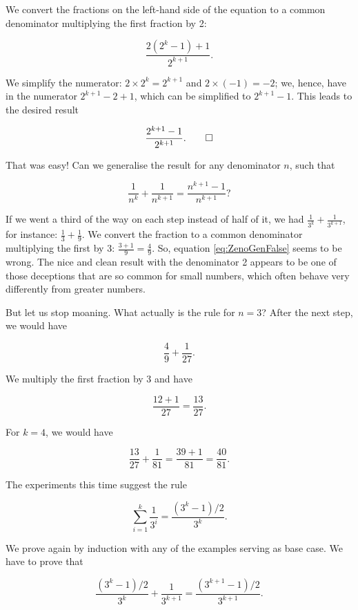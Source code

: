 \documentclass[tikz]{scrreprt}
\begin{document}
We convert the fractions on the left-hand side
of the equation to a common denominator
multiplying the first fraction by 2:

\[
\frac{2(2^k - 1) + 1}{2^{k+1}}.
\]

We simplify the numerator: 
$2 \times 2^k = 2^{k+1}$ and
$2 \times (-1) = -2$; we, hence, have in the numerator
$2^{k+1} - 2 + 1$, which can be simplified to
$2^{k+1} - 1$. This leads to the desired result

\[
\frac{2^{k+1} - 1}{2^{k+1}}.\qed
\]

That was easy!
Can we generalise the result for any denominator $n$,
such that

\begin{equation}\label{eq:ZenoGenFalse}
\frac{1}{n^k} + \frac{1}{n^{k+1}} = 
\frac{n^{k+1} - 1}{n^{k+1}}?
\end{equation}

If we went a third of the way on each step
instead of half of it, we had
$\frac{1}{3^k} + \frac{1}{3^{k+1}}$, for instance:
$\frac{1}{3} + \frac{1}{9}$.
We convert the fraction to a common 
denominator multiplying the first by 3:
$\frac{3+1}{9} = \frac{4}{9}$.
So, equation \ref{eq:ZenoGenFalse} seems to be wrong.
The nice and clean result with the denominator 2
appears to be one of those deceptions that are so common
for small numbers, which often behave very differently
from greater numbers.

But let us stop moaning. What actually is the rule
for $n=3$? After the next step, we would have

\[
\frac{4}{9} + \frac{1}{27}.
\] 

We multiply the first fraction by 3 and have

\[
\frac{12+1}{27} =
\frac{13}{27}.
\] 

For $k=4$, we would have

\[
\frac{13}{27} + \frac{1}{81} =
\frac{39 + 1}{81} =  \frac{40}{81}.
\] 

The experiments this time suggest the rule

\begin{equation}\label{eq:Zeno3}
\sum_{i=1}^k{\frac{1}{3^i}} = 
\frac{(3^k - 1) / 2}{3^k}.
\end{equation}

We prove again by induction with any of the examples
serving as base case.
We have to prove that 

\begin{equation}
\frac{(3^k - 1) / 2}{3^k} + \frac{1}{3^{k+1}} =
\frac{(3^{k+1} - 1) / 2}{3^{k+1}}.
\end{equation}
\end{document}
